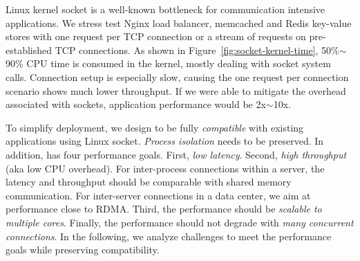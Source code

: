 Linux kernel socket is a well-known bottleneck for communication intensive applications. We stress test Nginx load balancer, memcached and Redis key-value stores with one request per TCP connection or a stream of requests on pre-established TCP connections. As shown in Figure~\ref{fig:socket-kernel-time}, 50\%$\sim$90\% CPU time is consumed in the kernel, mostly dealing with socket system calls. Connection setup is especially slow, causing the one request per connection scenario shows much lower throughput. If we were able to mitigate the overhead associated with sockets, application performance would be 2x$\sim$10x.








To simplify deployment, we design \sys to be fully \textit{compatible} with existing applications using Linux socket. \textit{Process isolation} needs to be preserved. In addition, \sys has four performance goals. First, \textit{low latency}. Second, \textit{high throughput} (aka low CPU overhead). For inter-process connections within a server, the latency and throughput should be comparable with shared memory communication. For inter-server connections in a data center, we aim at performance close to RDMA. Third, the performance should be \textit{scalable to multiple cores}. Finally, the performance should not degrade with \textit{many concurrent connections}.
In the following, we analyze challenges to meet the performance goals while preserving compatibility.

